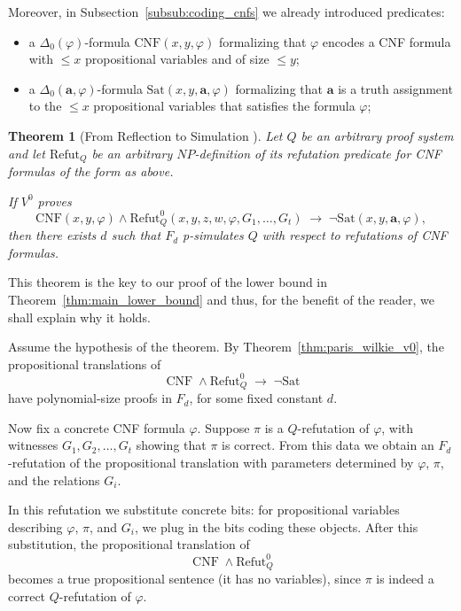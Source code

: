 \documentclass{article}
\theoremstyle{plain}
\newtheorem{theorem}{Theorem}[section]
\theoremstyle{definition}
\DeclareMathOperator{\CNF}{CNF}
\newcommand{\tuple}{\mathbf}
\begin{document}
Moreover, in Subsection~\ref{subsub:coding_cnfs} we already introduced predicates:

\begin{itemize}
  \item a $\Delta_0(\varphi)$-formula $\mathrm{CNF}(x,y, \varphi)$ formalizing that $\varphi$ encodes a
  CNF formula with $\le x$ propositional variables and of size $\le y$;

  \item a $\Delta_0(\tuple a,\varphi)$-formula $\mathrm{Sat}(x,y, \tuple a, \varphi)$ formalizing that $\tuple a$ is a truth
  assignment to the $\le x$ propositional variables that satisfies the formula $\varphi
  $;
\end{itemize}

\begin{theorem}[From Reflection to Simulation {\cite[Section~8.4]{krajicek2019}}]\label{thm:reflection_theorem}
    Let $Q$ be an arbitrary proof system and let $\mathrm{Refut}_Q$ be an arbitrary
$NP$-definition of its refutation predicate for CNF formulas of the form as above.

If $V^0$ proves 
\[
\mathrm{CNF}(x,y, \varphi) \wedge \mathrm{Refut}_Q^0(x,y,z,w,\varphi,G_1,\ldots,G_t) \;\rightarrow\; \neg\mathrm{Sat}(x,y,\tuple a,\varphi),
\]
then there exists $d$ such that $F_d$ p-simulates $Q$ with respect to refutations of CNF formulas.
\end{theorem}

This theorem is the key to our proof of the lower bound in Theorem~\ref{thm:main_lower_bound} and thus,
for the benefit of the reader, we shall explain why it holds.


Assume the hypothesis of the theorem. By Theorem~\ref{thm:paris_wilkie_v0},
the propositional translations of
\[
\CNF \wedge \mathrm{Refut}_Q^0 \;\rightarrow\; \neg \mathrm{Sat}
\]
have polynomial-size proofs in $F_d$, for some fixed constant $d$.

Now fix a concrete CNF formula $\varphi$.
Suppose $\pi$ is a $Q$-refutation of $\varphi$,
with witnesses $G_1,G_2,\dots,G_t$ showing that $\pi$ is correct.
From this data we obtain an $F_d$-refutation of the propositional translation
with parameters determined by $\varphi$, $\pi$, and the relations $G_i$.

In this refutation we substitute concrete bits:
for propositional variables describing $\varphi$, $\pi$, and $G_i$,
we plug in the bits coding these objects.
After this substitution, the propositional translation of
\[
\CNF \wedge \mathrm{Refut}_Q^0
\]
becomes a true propositional sentence (it has no variables),
since $\pi$ is indeed a correct $Q$-refutation of $\varphi$.
\end{document}
